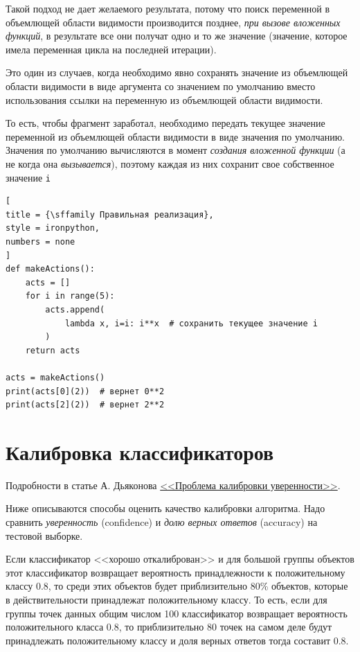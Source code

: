 \documentclass[%
	11pt,
	a4paper,
	utf8,
		]{article}
\begin{document}
Такой подход не дает желаемого результата, потому что поиск переменной в объемлющей области видимости производится позднее, \emph{при вызове вложенных функций}, в результате все они получат одно и то же значение (значение, которое имела переменная цикла на последней итерации).

Это один из случаев, когда необходимо явно сохранять значение из объемлющей области видимости в виде аргумента со значением по умолчанию вместо использования ссылки на переменную из объемлющей области видимости.

То есть, чтобы фрагмент заработал, необходимо передать текущее значение переменной из объемлющей области видимости в виде значения по умолчанию. Значения по умолчанию вычисляются в момент \emph{создания вложенной функции} (а не когда она \emph{вызывается}), поэтому каждая из них сохранит свое собственное значение \texttt{i}

\begin{lstlisting}[
title = {\sffamily Правильная реализация},
style = ironpython,
numbers = none
]
def makeActions():
    acts = []
    for i in range(5):
        acts.append(
            lambda x, i=i: i**x  # сохранить текущее значение i
        )
    return acts

acts = makeActions()
print(acts[0](2))  # вернет 0**2
print(acts[2](2))  # вернет 2**2
\end{lstlisting}


\section{Калибровка классификаторов}

Подробности в статье А. Дьяконова \href{https://dyakonov.org/2020/03/27/%D0%BF%D1%80%D0%BE%D0%B1%D0%BB%D0%B5%D0%BC%D0%B0-%D0%BA%D0%B0%D0%BB%D0%B8%D0%B1%D1%80%D0%BE%D0%B2%D0%BA%D0%B8-%D1%83%D0%B2%D0%B5%D1%80%D0%B5%D0%BD%D0%BD%D0%BE%D1%81%D1%82%D0%B8/}{<<Проблема калибровки уверенности>>}.
\vspace{2mm}

Ниже описываются способы оценить качество калибровки алгоритма. Надо сравнить \emph{уверенность} (confidence) и \emph{долю верных ответов} (accuracy) на тестовой выборке.

Если классификатор <<хорошо откалиброван>> и для большой группы объектов этот классификатор возвращает вероятность принадлежности к положительному классу 0.8, то среди этих объектов будет приблизительно 80\% объектов, которые в действительности принадлежат положительному классу. То есть, если для группы точек данных общим числом 100 классификатор возвращает вероятность положительного класса 0.8, то приблизительно 80 точек на самом деле будут принадлежать положительному классу и доля верных ответов тогда составит 0.8.
\end{document}
